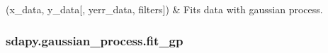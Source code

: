 \documentclass[letterpaper,10pt,english]{sphinxmanual}
\begin{document}
\begin{savenotes}\sphinxatlongtablestart\begin{longtable}[c]{}
\hline

\endfirsthead

%
{}\\
\hline

\endhead

\hline
{}\\
\endfoot

\endlastfoot

{\hyperref[\detokenize{generated/sdapy.gaussian_process.fit_gp:sdapy.gaussian_process.fit_gp}]{}}(x\_data, y\_data{[}, yerr\_data, filters{]})
&
Fits data with gaussian process.
\\
\hline
\end{longtable}\sphinxatlongtableend\end{savenotes}


\subsubsection{sdapy.gaussian\_process.fit\_gp}
\label{\detokenize{generated/sdapy.gaussian_process.fit_gp:sdapy-gaussian-process-fit-gp}}\label{\detokenize{generated/sdapy.gaussian_process.fit_gp::doc}}
\end{document}

